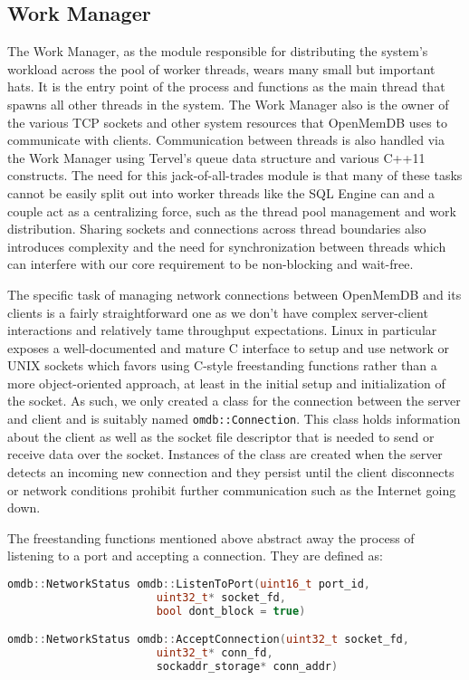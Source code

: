 \documentclass[letterpaper, 12pt]{article}
\begin{document}
  \subsection{Work Manager}
  The Work Manager, as the module responsible for distributing the system's workload across the
  pool of worker threads, wears many small but important hats. It is the entry point of the
  process and functions as the main thread that spawns all other threads in the system. The Work
  Manager also is the owner of the various TCP sockets and other system resources that OpenMemDB 
  uses to communicate with clients. Communication between threads is also handled via the 
  Work Manager using Tervel's queue data structure and various C++11 constructs. The need for this
  jack-of-all-trades module is that many of these tasks cannot be easily split out into 
  worker threads like the SQL Engine can and a couple act as a centralizing force, such as the
  thread pool management and work distribution. Sharing sockets and connections across thread
  boundaries also introduces complexity and the need for synchronization between threads which
  can interfere with our core requirement to be non-blocking and wait-free.
  \par\vspace{\baselineskip}
  The specific task of managing network connections between OpenMemDB and its clients is a fairly
  straightforward one as we don't have complex server-client interactions and relatively tame
  throughput expectations. Linux in particular exposes a well-documented and mature C interface
  to setup and use network or UNIX sockets which favors using C-style freestanding functions
  rather than a more object-oriented approach, at least in the initial setup and initialization
  of the socket. As such, we only created a class for the connection between the server and client
  and is suitably named \lstinline[basicstyle=\ttfamily]|omdb::Connection|. This class holds
  information about the client as well as the socket file descriptor that is needed to send
  or receive data over the socket. Instances of the class are created when the server detects an 
  incoming new connection and they persist until the client disconnects or network conditions 
  prohibit further communication such as the Internet going down.
  \par\vspace{\baselineskip}
  The freestanding functions mentioned above abstract away the process of listening to a port
  and accepting a connection. They are defined as:
  \begin{lstlisting}[language=C++]
omdb::NetworkStatus omdb::ListenToPort(uint16_t port_id, 
				       uint32_t* socket_fd, 
				       bool dont_block = true)

omdb::NetworkStatus omdb::AcceptConnection(uint32_t socket_fd,
					   uint32_t* conn_fd, 
					   sockaddr_storage* conn_addr)
  \end{lstlisting}
\end{document}
